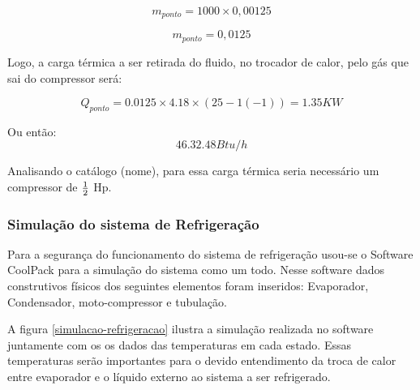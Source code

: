            \begin{equation}
                m_{ponto} = 1000 \times 0,00125
            \end{equation}

            \begin{equation}
                m_{ponto} = 0,0125
            \end{equation}

            Logo, a carga térmica a ser retirada do fluido, no trocador de calor,
            pelo gás que sai do compressor será:
            
            \begin{equation}
                Q_{ponto} = 0.0125 \times 4.18 \times (25-1(-1)) = 1.35 KW
            \end{equation}

            Ou então:
            \begin{equation}
                46.32.48 Btu/h
            \end{equation}

            Analisando o catálogo (nome), para essa carga térmica seria necessário um compressor de
            $1 \over 2$ Hp.

            \subsubsection[Simulação do sistema de Refrigeração]{Simulação do sistema de Refrigeração}
                Para a segurança do funcionamento do sistema de refrigeração usou-se o
                Software CoolPack para a simulação do sistema como um todo. Nesse
                software dados construtivos físicos dos seguintes elementos foram inseridos: 
                Evaporador, Condensador, moto-compressor e tubulação. 

                A figura \ref{simulacao-refrigeracao} ilustra a simulação realizada no software juntamente com os os
                dados das temperaturas em cada estado. Essas temperaturas serão importantes para o
                devido entendimento da troca de calor entre evaporador e o líquido externo ao
                sistema a ser refrigerado.

